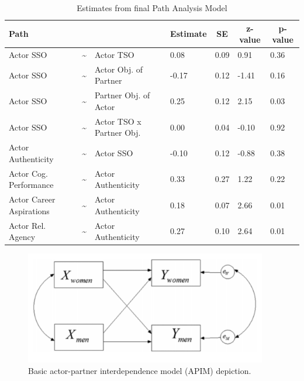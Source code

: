 \documentclass[man]{apa6}
\begin{document}
\begin{table}[tbp]
\begin{center}
\begin{threeparttable}
\caption{\label{tab:sem}Estimates from final Path Analysis Model}
\small{
\begin{tabular}{lllllll}
\toprule
Path & \multicolumn{1}{c}{} & \multicolumn{1}{c}{} & \multicolumn{1}{c}{Estimate} & \multicolumn{1}{c}{SE} & \multicolumn{1}{c}{z-value} & \multicolumn{1}{c}{p-value}\\
\midrule
Actor SSO & \textasciitilde{} & Actor TSO & 0.08 & 0.09 & 0.91 & 0.36\\
Actor SSO & \textasciitilde{} & Actor Obj. of Partner & -0.17 & 0.12 & -1.41 & 0.16\\
Actor SSO & \textasciitilde{} & Partner Obj. of Actor & 0.25 & 0.12 & 2.15 & 0.03\\
Actor SSO & \textasciitilde{} & Actor TSO x Partner Obj. & 0.00 & 0.04 & -0.10 & 0.92\\
Actor Authenticity & \textasciitilde{} & Actor SSO & -0.10 & 0.12 & -0.88 & 0.38\\
Actor Cog. Performance & \textasciitilde{} & Actor Authenticity & 0.33 & 0.27 & 1.22 & 0.22\\
Actor Career Aspirations & \textasciitilde{} & Actor Authenticity & 0.18 & 0.07 & 2.66 & 0.01\\
Actor Rel. Agency & \textasciitilde{} & Actor Authenticity & 0.27 & 0.10 & 2.64 & 0.01\\
\bottomrule
\end{tabular}
}
\end{threeparttable}
\end{center}
\end{table}

\begin{figure}
\includegraphics[width=400px]{APIM_figure} \caption{Basic actor-partner interdependence model (APIM) depiction.}\label{fig:apim}
\end{figure}
\end{document}
